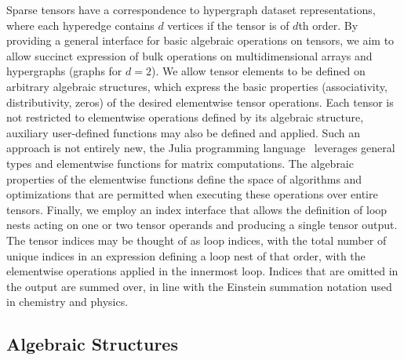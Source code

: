 

Sparse tensors have a correspondence to hypergraph dataset representations, where each hyperedge contains $d$ vertices if the tensor is of $d$th order.
By providing a general interface for basic algebraic operations on tensors, we aim to allow succinct expression of bulk operations on multidimensional arrays and hypergraphs (graphs for $d=2$).
We allow tensor elements to be defined on arbitrary algebraic structures, which express the basic properties (associativity, distributivity, zeros) of the desired elementwise tensor operations.
Each tensor is not restricted to elementwise operations defined by its algebraic structure, auxiliary user-defined functions may also be defined and applied. 
Such an approach is not entirely new, the Julia programming language~\cite{2012arXiv1209.5145B} leverages general types and elementwise functions for matrix computations.
The algebraic properties of the elementwise functions define the space of algorithms and optimizations that are permitted when executing these operations over entire tensors.
Finally, we employ an index interface that allows the definition of loop nests acting on one or two tensor operands and producing a single tensor output.
The tensor indices may be thought of as loop indices, with the total number of unique indices in an expression defining a loop nest of that order, with the elementwise operations applied in the innermost loop.
Indices that are omitted in the output are summed over, in line with the Einstein summation notation used in chemistry and physics.


\subsection{Algebraic Structures}
\label{subsec:algstrct}

